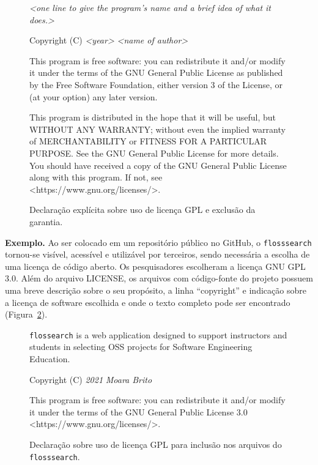 \renewenvironment{quote}
  {\small\list{}{\rightmargin=1cm \leftmargin=1cm}%
   \item\relax}
  {\endlist}
\begin{figure}[htb]
    \centering
\begin{quote}
\textit{<one line to give the program's name and a brief idea of what it does.>}
    
Copyright (C) \textit{<year>}  \textit{<name of author>}

This program is free software: you can redistribute it and/or modify it under the terms of the GNU General Public License as published by the Free Software Foundation, either version 3 of the License, or (at your option) any later version.

This program is distributed in the hope that it will be useful, but WITHOUT ANY WARRANTY; without even the implied warranty of MERCHANTABILITY or FITNESS FOR A PARTICULAR PURPOSE. See the
GNU General Public License for more details.
You should have received a copy of the GNU General Public License along with this program.  If not, see <https://www.gnu.org/licenses/>.
\end{quote}
\caption{Declaração explícita sobre uso de licença GPL e exclusão da garantia.} \label{fig:warranty}
\end{figure}

\noindent\textbf{Exemplo.}
Ao ser colocado em um repositório público no GitHub, 
o \RSw \texttt{flosssearch} tornou-se visível, acessível e utilizável por terceiros, sendo necessária a escolha de uma licença de código aberto. Os pesquisadores escolheram a licença GNU GPL 3.0. 
Além do arquivo LICENSE, os arquivos com código-fonte do projeto possuem uma breve descrição sobre o seu propósito, a linha ``copyright'' e indicação sobre a licença de software escolhida e onde o texto completo pode ser encontrado (Figura~\ref{fig:license:moara}).


\renewenvironment{quote}
  {\small\list{}{\rightmargin=1cm \leftmargin=1cm}%
   \item\relax}
  {\endlist}
\begin{figure}[htb]
\centering
\begin{quote}
\texttt{flossearch} is a web application designed to support instructors and students in selecting OSS projects for Software Engineering Education.

Copyright (C) \textit{2021}  \textit{Moara Brito}

This program is free software: you can redistribute it and/or modify it under the terms of the GNU General Public License 3.0 <https://www.gnu.org/licenses/>.
\end{quote}
\caption{Declaração sobre uso de licença GPL para inclusão nos arquivos do \texttt{flosssearch}.} \label{fig:license:moara}
\end{figure}

